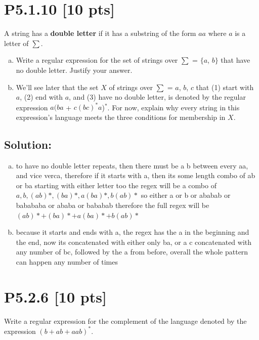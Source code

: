 \documentclass[12pt]{article}
\begin{document}
\newpage
\section*{\textbf{P5.1.10} [10 pts]}
 A string has a \textbf{double letter} if it has a substring of the form $aa$ where $a$ is a letter of $\sum$.
\begin{enumerate}[(a)]
    \item Write a regular expression for the set of strings over $\sum$ = $\{a$, $b\}$ that have no double letter. Justify your answer.

    \item We’ll see later that the set $X$ of strings over $\sum$ = $a$, $b$, $c$ that (1) start with $a$, (2) end with $a$, and (3) have no double letter, is denoted by the regular expression $a(ba$ + $c(bc)^*a$)$^*$. For now, explain why every string in this expression’s language meets the three conditions for membership in $X$.
    
\end{enumerate}

\subsection*{\textbf{Solution:}}
\begin{enumerate}[(a)]
    \item to have no double letter repeats, then there must be a b between every aa, and vice verca, therefore if it starts with a, then its some length combo of ab or ba starting with either letter too \newline
    the regex will be a combo of $a,b,(ab)*,(ba)*,a(ba)*,b(ab)*$ so either a or b or ababab or babababa or ababa or bababab\newline
    therefore the full regex will be $(ab)*+(ba)*+a(ba)*+b(ab)*$
    \item because it starts and ends with a, the regex has the a in the beginning and the end, now its concatenated with either only ba, or a c concatenated with any number of bc, followed by the a from before, overall the whole pattern can happen any number of times
    
\end{enumerate}


\newpage
\section*{\textbf{P5.2.6} [10 pts]}
 Write a regular expression for the complement of the language denoted by the expression $(b + ab + aab)^*$.
\end{document}
